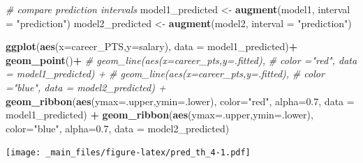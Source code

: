 \documentclass[
]{book}
\newenvironment{Shaded}{\begin{snugshade}}{\end{snugshade}}
\newcommand{\AttributeTok}[1]{\textcolor[rgb]{0.13,0.29,0.53}{#1}}
\newcommand{\CommentTok}[1]{\textcolor[rgb]{0.56,0.35,0.01}{\textit{#1}}}
\newcommand{\FloatTok}[1]{\textcolor[rgb]{0.00,0.00,0.81}{#1}}
\newcommand{\FunctionTok}[1]{\textcolor[rgb]{0.13,0.29,0.53}{\textbf{#1}}}
\newcommand{\NormalTok}[1]{#1}
\newcommand{\OtherTok}[1]{\textcolor[rgb]{0.56,0.35,0.01}{#1}}
\newcommand{\SpecialCharTok}[1]{\textcolor[rgb]{0.81,0.36,0.00}{\textbf{#1}}}
\newcommand{\StringTok}[1]{\textcolor[rgb]{0.31,0.60,0.02}{#1}}
\begin{document}
\begin{Shaded}
\begin{Highlighting}[]
\CommentTok{\# compare prediction intervals}
\NormalTok{model1\_predicted }\OtherTok{\textless{}{-}} \FunctionTok{augment}\NormalTok{(model1, }\AttributeTok{interval =} \StringTok{"prediction"}\NormalTok{)}
\NormalTok{model2\_predicted }\OtherTok{\textless{}{-}} \FunctionTok{augment}\NormalTok{(model2, }\AttributeTok{interval =} \StringTok{"prediction"}\NormalTok{)}

  \FunctionTok{ggplot}\NormalTok{(}\FunctionTok{aes}\NormalTok{(}\AttributeTok{x=}\NormalTok{career\_PTS,}\AttributeTok{y=}\NormalTok{salary), }\AttributeTok{data =}\NormalTok{ model1\_predicted)}\SpecialCharTok{+}
  \FunctionTok{geom\_point}\NormalTok{()}\SpecialCharTok{+}
  \CommentTok{\# geom\_line(aes(x=career\_pts,y=.fitted),}
  \CommentTok{\#           color ="red", data = model1\_predicted) +}
  \CommentTok{\# geom\_line(aes(x=career\_pts,y=.fitted),}
  \CommentTok{\#          color ="blue", data = model2\_predicted) +}
  \FunctionTok{geom\_ribbon}\NormalTok{(}\FunctionTok{aes}\NormalTok{(}\AttributeTok{ymax=}\NormalTok{.upper,}\AttributeTok{ymin=}\NormalTok{.lower),}
              \AttributeTok{color=}\StringTok{"red"}\NormalTok{,}
              \AttributeTok{alpha=}\FloatTok{0.7}\NormalTok{,}
              \AttributeTok{data =}\NormalTok{ model1\_predicted) }\SpecialCharTok{+}
  \FunctionTok{geom\_ribbon}\NormalTok{(}\FunctionTok{aes}\NormalTok{(}\AttributeTok{ymax=}\NormalTok{.upper,}\AttributeTok{ymin=}\NormalTok{.lower),}
              \AttributeTok{color=}\StringTok{"blue"}\NormalTok{,}
              \AttributeTok{alpha=}\FloatTok{0.7}\NormalTok{,}
              \AttributeTok{data =}\NormalTok{ model2\_predicted)}
\end{Highlighting}
\end{Shaded}

\texttt{[image: \_main\_files/figure-latex/pred\_th\_4-1.pdf]}

\begin{Shaded}
\end{Shaded}
\end{document}
